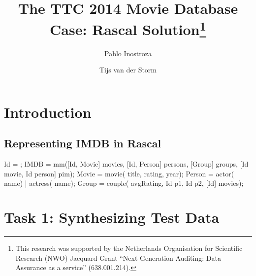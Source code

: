 \documentclass[submission,copyright,creativecommons]{eptcs}
\title{The TTC 2014 Movie Database Case: Rascal Solution\thanks{This
    research was supported by the Netherlands Organisation for
    Scientific Research (NWO) Jacquard Grant ``Next Generation
    Auditing: Data-Assurance as a service'' (638.001.214).}}
\author{Pablo Inostroza \and Tijs van der Storm}
\begin{document}
\maketitle

\begin{abstract}

\end{abstract}

\section{Introduction}

\subsection{Representing IMDB in Rascal}

\begin{rascal}
 Id = ;
 IMDB = mm([Id, Movie] movies,
                  [Id, Person] persons, 
                  [Group] groups, 
                  [Id movie, Id person] pim);
 Movie = movie( title,  rating,  year);
 Person 
  = actor( name) 
  | actress( name);
 Group = couple( avgRating, Id p1, Id p2, [Id] movies);
\end{rascal}

\section{Task 1: Synthesizing Test Data}
\end{document}
